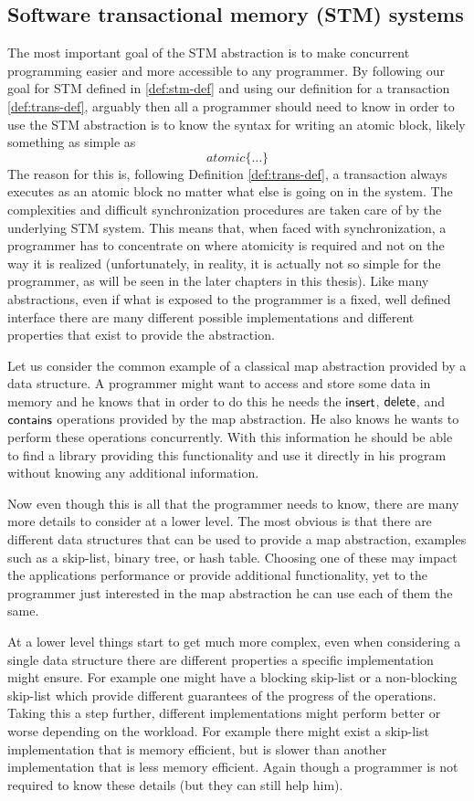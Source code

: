 \subsection{Software transactional memory (STM) systems}
The most important goal of the STM abstraction is to make concurrent programming
easier and more accessible to any programmer.
By following our goal for STM defined in \ref{def:stm-def} and using our definition for a transaction \ref{def:trans-def},
arguably then all a programmer should need to know in order to use the STM abstraction is to know
the syntax for writing an atomic block, likely something as simple as
$$atomic \{ \dots \} $$
The reason for this is, following Definition \ref{def:trans-def}, a transaction always executes as an atomic block
no matter what else is going on in the system.
The complexities and difficult synchronization procedures are taken care of by the
underlying STM system.
This means that, when faced with synchronization,  a programmer has 
to concentrate on where atomicity is required and not on the way it is 
realized
(unfortunately, in reality, it is actually not so simple for the programmer, as will
be seen in the later chapters in this thesis).
Like many abstractions, even if what is exposed to the programmer is a fixed, well
defined interface there are many different possible implementations and different
properties that exist to provide the abstraction.

Let us consider the common example of a classical map abstraction provided by a
data structure.  A programmer might want to access and store some data in memory
and he knows that in order to do this he needs the ${\sf insert}$, ${\sf delete}$, and ${\sf contains}$
operations provided by the map abstraction.
He also knows he wants to perform these operations concurrently.
With this information he should be able to find a library providing this
functionality and use it directly in his program without knowing any additional information.

Now even though this is all that the programmer needs to know, there are many
more details to consider at a lower level.
The most obvious is that there are different data structures that can be used to
provide a map abstraction, examples such as a skip-list, binary tree, or hash table.
Choosing one of these may impact the applications performance or provide additional
functionality, yet
to the programmer just interested in the map abstraction he can use each of them the same.

At a lower level things start to get much more complex,
even when considering a single data structure there are different properties a specific implementation might ensure.
For example one might have a blocking skip-list or a non-blocking skip-list which provide
different guarantees of the progress of the operations.
Taking this a step further, different implementations might perform
better or worse depending on the workload.
For example there might exist a skip-list implementation that is memory efficient, but is slower
than another implementation that is less memory efficient.
Again though a programmer is not required to know these details (but they can still help him).

